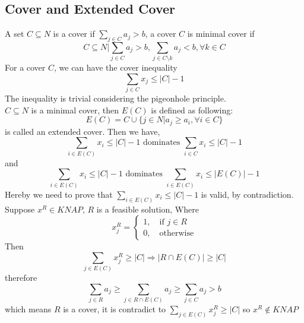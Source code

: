			\subsection{Cover and Extended Cover}
				A set $C\subseteq N$ is a cover if $\sum_{j\in C} a_j > b$, a cover $C$ is minimal cover if
				\begin{equation}
					C\subseteq N | \sum_{j\in C}a_j>b, \sum_{j\in C\setminus k} a_j < b, \forall k \in C 
				\end{equation}
				For a cover $C$, we can have the cover inequality
				\begin{equation}
					\sum_{j\in C}x_j \le |C|-1
				\end{equation}
				The inequality is trivial considering the pigeonhole principle.\\
				$C\subseteq N$ is a minimal cover, then $E(C)$ is defined as following:
				\begin{equation}
					E(C) = C\cup \{j \in N | a_j \ge a_i, \forall i \in C\}
				\end{equation}
				is called an extended cover. Then we have,
				\begin{equation}
					\sum_{i\in E(C)} x_i \le |C| - 1 \text{ dominates } \sum_{i\in C} x_i \le |C| - 1
				\end{equation}
				and
				\begin{equation}
					\sum_{i\in E(C)} x_i \le |C| - 1 \text{ dominates } \sum_{i\in E(C)} x_i \le |E(C)| - 1
				\end{equation}
				Hereby we need to prove that $\sum_{i\in E(C)} x_i \le |C| - 1$ is valid, by contradiction.\\
				 Suppose $x^R \in KNAP$, $R$ is a feasible solution, Where
				\begin{equation}
					x^R_j = \begin{cases}1, \quad \text{if $j\in R$} \\ 0, \quad \text{otherwise}\end{cases} 
				\end{equation}
				Then
				\begin{equation}
					\sum_{j\in E(C)}x^R_j \ge |C| \Rightarrow |R \cap E(C)| \ge |C|  
				\end{equation}
				therefore
				\begin{equation}
					\sum_{j\in R}a_j \ge \sum_{j\in R \cap E(C)} a_j \ge \sum_{j\in C} a_j > b 
				\end{equation}
				which means $R$ is a cover, it is contradict to $\sum_{j\in E(C)}x^R_j \ge |C|$ so $x^R \notin KNAP$

